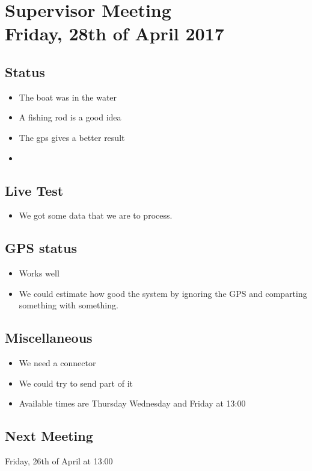 
\renewcommand{\vec}[1]{\boldsymbol{\mathbf{#1}}}


\section*{Supervisor Meeting\\ \small Friday, 28th of April 2017}

\subsection{Status}
\begin{itemize}
    \item The boat was in the water
    \item A fishing rod is a good idea
    \item The gps gives a better result
    \item 
\end{itemize}
\subsection{Live Test}
\begin{itemize}
	\item We got some data that we are to process.
\end{itemize}	
\subsection{GPS status}
\begin{itemize}
    \item Works well
\end{itemize}
\begin{itemize}
	\item We could estimate how good the system by ignoring the GPS and comparting something with something.  
\end{itemize}
\subsection{Miscellaneous}
\begin{itemize}
	\item We need a connector
	\item We could try to send part of it
	\item Available times are Thursday Wednesday and Friday at 13:00
\end{itemize}

\subsection{Next Meeting}
Friday, 26th of April at 13:00
